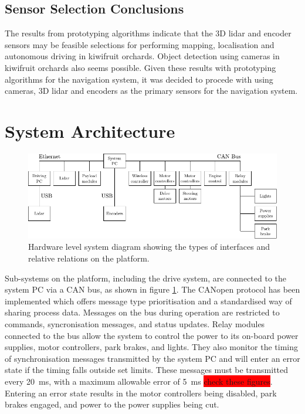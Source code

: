 \documentclass[preprint,authoryear,12pt]{elsarticle}
\begin{document}
\subsection{Sensor Selection Conclusions}
    The results from prototyping algorithms indicate that the 3D lidar and encoder sensors may be feasible selections for performing mapping, localisation and autonomous driving in kiwifruit orchards.
	Object detection using cameras in kiwifruit orchards also seems possible.
	Given these results with prototyping algorithms for the navigation system, it was decided to procede with using cameras, 3D lidar and encoders as the primary sensors for the navigation system.



\section{System Architecture}
\label{sect:hardware}

    \newcommand{\rpm}{\raisebox{.2ex}{$\scriptstyle\pm$}}

    \begin{figure}[htb]
        \centering
        \includegraphics[width=\linewidth]{imgs/system_diagram/diagram_v3.pdf}
        \caption{Hardware level system diagram showing the types of interfaces and relative relations on the platform.}
        \label{fig:system_diagram}
    \end{figure}
    Sub-systems on the platform, including the drive system, are connected to the system PC via a CAN bus, as shown in figure \ref{fig:system_diagram}.
    The CANopen protocol has been implemented which offers message type prioritisation and a standardised way of sharing process data.
    Messages on the bus during operation are restricted to commands, syncronisation messages, and status updates.
    Relay modules connected to the bus allow the system to control the power to its on-board power supplies, motor controllers, park brakes, and lights.
    They also monitor the timing of synchronisation messages transmitted by the system PC and will enter an error state if the timing falls outside set limits.
    These messages must be transmitted every \SI{20}{\milli\second}, with a maximum allowable error of \rpm \SI{5}{\milli\second} \colorbox{red}{check these figures}.
    Entering an error state results in the motor controllers being disabled, park brakes engaged, and power to the power supplies being cut.
\end{document}
